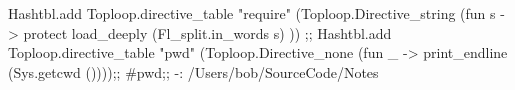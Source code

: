 \begin{ocamlcode}
Hashtbl.add
    Toploop.directive_table
    "require"
    (Toploop.Directive_string
       (fun s ->  protect load_deeply (Fl_split.in_words s)
       ))
;;
Hashtbl.add Toploop.directive_table "pwd"
(Toploop.Directive_none (fun _ -> 
  print_endline (Sys.getcwd ())));;
#pwd;;
-: /Users/bob/SourceCode/Notes
\end{ocamlcode}




